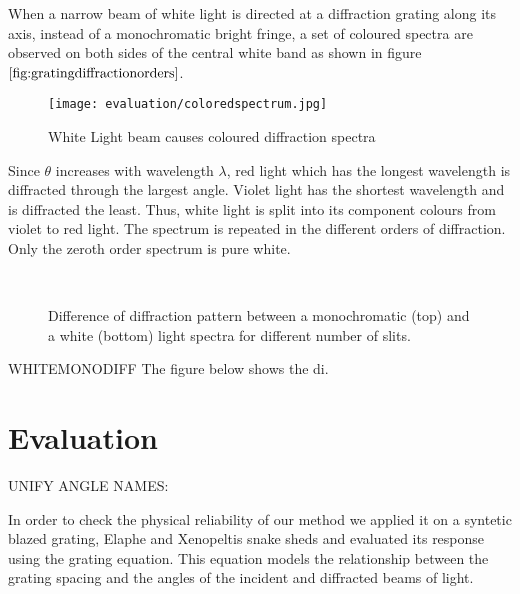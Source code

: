 When a narrow beam of white light is directed at a diffraction grating along its axis, instead of a monochromatic bright fringe, a set of coloured spectra are observed on both sides of the central white band as shown in figure $\ref{fig:gratingdiffractionorders}$.

\begin{figure}[ht]
  \centering
  \texttt{[image: evaluation/coloredspectrum.jpg]}
  \label{fig:diffractionSpectrum}
  \caption{White Light beam causes coloured diffraction spectra}
\end{figure}

Since $\theta$ increases with wavelength $\lambda$, red light which has the longest wavelength is diffracted through the largest angle. Violet light has the shortest wavelength and is diffracted the least. Thus, white light is split into its component colours from violet to red light. The spectrum is repeated in the different orders of diffraction. Only the zeroth order spectrum is pure white.

\begin{figure}[ht]
  \centering
~
~
~
  
  \label{fig:diffractionSlits}
  \caption{Difference of diffraction pattern between a monochromatic (top) and a white (bottom) light spectra for different number of slits.}
\end{figure}


WHITEMONODIFF
The figure below shows the di.


\section{Evaluation}
UNIFY ANGLE NAMES: 

In order to check the physical reliability of our method we applied it on a syntetic blazed grating, Elaphe and Xenopeltis snake sheds and evaluated its response using the grating equation. This equation models the relationship between the grating spacing and the angles of the incident and diffracted beams of light. 

